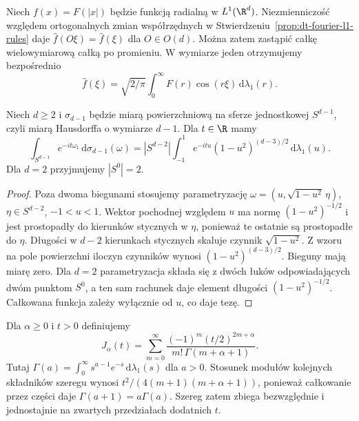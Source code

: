 Niech $f(x)=F(|x|)$ będzie funkcją radialną w $L^1(\R^d)$.
Niezmienniczość względem ortogonalnych zmian współrzędnych
w Stwierdzeniu~\ref{prop:dt-fourier-l1-rules} daje
$\widehat f(O\xi)=\widehat f(\xi)$ dla $O\in O(d)$.
Można zatem zastąpić całkę wielowymiarową całką po
promieniu. W wymiarze jeden otrzymujemy bezpośrednio
\[
 \widehat f(\xi)=\sqrt{2/\pi}\int_0^\infty
 F(r)\cos(r\xi)\,\mathrm d\lambda_1(r).
\]

\begin{lemat}
\label{lem:dt-fourier-sphere-kernel}
Niech $d\ge2$ i $\sigma_{d-1}$ będzie miarą powierzchniową
na sferze jednostkowej $S^{d-1}$, czyli miarą Hausdorffa
o wymiarze $d-1$. Dla $t\in\R$ mamy
\[
 \int_{S^{d-1}}e^{-it\omega_1}\,\mathrm d\sigma_{d-1}(\omega)
 =|S^{d-2}|\int_{-1}^1 e^{-itu}(1-u^2)^{(d-3)/2}
 \,\mathrm d\lambda_1(u).
\]
Dla $d=2$ przyjmujemy $|S^0|=2$.
\end{lemat}
\begin{proof}
Poza dwoma biegunami stosujemy parametryzację
$\omega=(u,\sqrt{1-u^2}\,\eta)$, $\eta\in S^{d-2}$,
$-1<u<1$. Wektor pochodnej względem $u$ ma normę
$(1-u^2)^{-1/2}$ i jest prostopadły do kierunków
stycznych w $\eta$, ponieważ te ostatnie są prostopadłe
do $\eta$. Długości w $d-2$ kierunkach stycznych
skaluje czynnik $\sqrt{1-u^2}$. Z wzoru na pole
powierzchni iloczyn czynników wynosi
$(1-u^2)^{(d-3)/2}$. Bieguny mają miarę zero.
Dla $d=2$ parametryzacja składa się z dwóch łuków
odpowiadających dwóm punktom $S^0$, a ten sam
rachunek daje element długości $(1-u^2)^{-1/2}$.
Całkowana funkcja zależy wyłącznie od $u$, co daje tezę.
\end{proof}

\begin{definicja}
\label{def:dt-bessel-j}
Dla $\alpha\ge0$ i $t>0$ definiujemy
\[
 J_\alpha(t)=\sum_{m=0}^\infty
 \frac{(-1)^m(t/2)^{2m+\alpha}}
      {m!\,\Gamma(m+\alpha+1)}.
\]
Tutaj $\Gamma(a)=\int_0^\infty
s^{a-1}e^{-s}\,\mathrm d\lambda_1(s)$ dla $a>0$.
Stosunek modułów kolejnych składników szeregu wynosi
$t^2/(4(m+1)(m+\alpha+1))$, ponieważ całkowanie
przez części daje $\Gamma(a+1)=a\Gamma(a)$.
Szereg zatem zbiega bezwzględnie i jednostajnie na
zwartych przedziałach dodatnich $t$.
\end{definicja}

